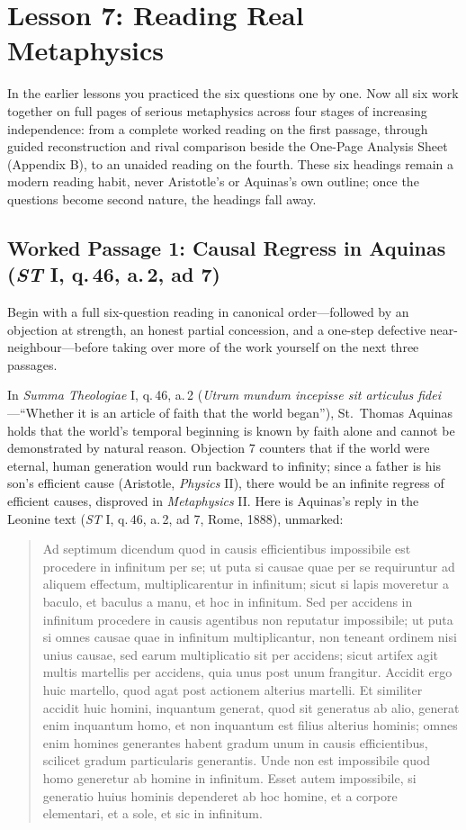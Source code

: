 \section{Lesson 7: Reading Real Metaphysics}

In the earlier lessons you practiced the six questions one by one. Now all six work together on full pages of serious metaphysics across four stages of increasing independence: from a complete worked reading on the first passage, through guided reconstruction and rival comparison beside the One-Page Analysis Sheet (Appendix B), to an unaided reading on the fourth. These six headings remain a modern reading habit, never Aristotle's or Aquinas's own outline; once the questions become second nature, the headings fall away.

\subsection{Worked Passage 1: Causal Regress in Aquinas (\emph{ST} I, q.\,46, a.\,2, ad 7)}

Begin with a full six-question reading in canonical order---followed by an objection at strength, an honest partial concession, and a one-step defective near-neighbour---before taking over more of the work yourself on the next three passages.

In \emph{Summa Theologiae} I, q.\,46, a.\,2 (\emph{Utrum mundum incepisse sit articulus fidei}---``Whether it is an article of faith that the world began''), St.\ Thomas Aquinas holds that the world's temporal beginning is known by faith alone and cannot be demonstrated by natural reason. Objection 7 counters that if the world were eternal, human generation would run backward to infinity; since a father is his son's efficient cause (Aristotle, \emph{Physics} II), there would be an infinite regress of efficient causes, disproved in \emph{Metaphysics} II. Here is Aquinas's reply in the Leonine text (\emph{ST} I, q.\,46, a.\,2, ad 7, Rome, 1888), unmarked:

\begin{quote}
Ad septimum dicendum quod in causis efficientibus impossibile est procedere in infinitum per se; ut puta si causae quae per se requiruntur ad aliquem effectum, multiplicarentur in infinitum; sicut si lapis moveretur a baculo, et baculus a manu, et hoc in infinitum. Sed per accidens in infinitum procedere in causis agentibus non reputatur impossibile; ut puta si omnes causae quae in infinitum multiplicantur, non teneant ordinem nisi unius causae, sed earum multiplicatio sit per accidens; sicut artifex agit multis martellis per accidens, quia unus post unum frangitur. Accidit ergo huic martello, quod agat post actionem alterius martelli. Et similiter accidit huic homini, inquantum generat, quod sit generatus ab alio, generat enim inquantum homo, et non inquantum est filius alterius hominis; omnes enim homines generantes habent gradum unum in causis efficientibus, scilicet gradum particularis generantis. Unde non est impossibile quod homo generetur ab homine in infinitum. Esset autem impossibile, si generatio huius hominis dependeret ab hoc homine, et a corpore elementari, et a sole, et sic in infinitum.
\end{quote}

